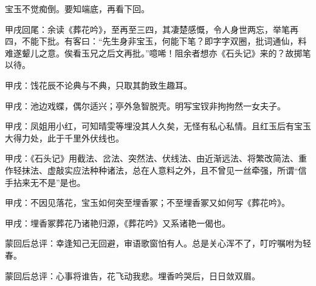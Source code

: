 \begin{parag}
    宝玉不觉痴倒。要知端底，再看下回。
\end{parag}


\begin{parag}
    \begin{note}甲戌回尾：余读《葬花吟》，至再至三四，其凄楚感慨，令人身世两忘，举笔再四，不能下批。有客曰：“先生身非宝玉，何能下笔？即字字双圈，批词通仙，料难遂颦儿之意。俟看玉兄之后文再批。”噫唏！阻余者想亦《石头记》来的？故掷笔以待。\end{note}
\end{parag}


\begin{parag}
    \begin{note}甲戌：饯花辰不论典与不典，只取其韵致生趣耳。\end{note}
\end{parag}


\begin{parag}
    \begin{note}甲戌：池边戏蝶，偶尔适兴；亭外急智脱壳。明写宝钗非拘拘然一女夫子。\end{note}
\end{parag}


\begin{parag}
    \begin{note}甲戌：凤姐用小红，可知晴雯等埋没其人久矣，无怪有私心私情。且红玉后有宝玉大得力处，此于千里外伏线也。\end{note}
\end{parag}


\begin{parag}
    \begin{note}甲戌：《石头记》用截法、岔法、突然法、伏线法、由近渐远法、将繁改简法、重作轻抹法、虚敲实应法种种诸法，总在人意料之外，且不曾见一丝牵强，所谓“信手拈来无不是”是也。\end{note}
\end{parag}


\begin{parag}
    \begin{note}甲戌：不因见落花，宝玉如何突至埋香冢；不至埋香冢又如何写《葬花吟》。\end{note}
\end{parag}


\begin{parag}
    \begin{note}甲戌：埋香冢葬花乃诸艳归源，《葬花吟》又系诸艳一偈也。\end{note}
\end{parag}


\begin{parag}
    \begin{note}蒙回后总评：幸逢知己无回避，审语歌窗怕有人。总是关心浑不了，叮咛嘱咐为轻春。\end{note}
\end{parag}


\begin{parag}
    \begin{note}蒙回后总评：心事将谁告，花飞动我悲。埋香吟哭后，日日敛双眉。\end{note}
\end{parag}

